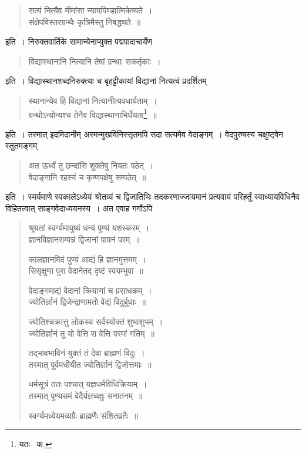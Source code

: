 \documentclass[11pt, openany]{book}
\begin{document}
\begin{quote}
 
{\qt सत्यं नित्यैव मीमांसा न्यायपिण्डात्मिकेष्यते~।\\
संक्षेपविस्तरग्रन्थैः कृत्रिमैस्तु निबद्ध्यते~॥}
\end{quote}

\noindent इति~। निरुक्तवार्तिके सामान्येनाप्युक्त पद्मपादाचार्येण\textendash 

\begin{quote} 
{\qt विद्यास्थानानि नित्यानि तेषां ग्रन्थाः सकर्तृकाः~।}
\end{quote}

\newpage

\noindent इति~। विद्यास्थानशब्दनिरुक्त्या च बृहट्टीकायां विद्यानां नित्यत्वं प्रदर्शितम्\textendash 

\begin{quote}
{\qt स्थानान्येव हि विद्यानां नित्यानीत्यवधार्यताम्~।\\
  ग्रन्थोऽन्योन्यश्च तेनैव विद्यास्थानाभिर्धेयता\renewcommand{\thefootnote}{१}\footnote{यतः \textendash\ क.}~॥}
\end{quote}

\noindent इति~। तस्मात् इदमिदानीम् अस्मन्मुखविनिस्सृतमपि सदा सत्यमेव वेदाङ्गम्~। वेदपुरुषस्य चक्षुष्ट्वेन स्तुतमङ्गम्\textendash 

\begin{quote}
{\qt अत ऊर्ध्वं तु छन्दांसि शुक्लेषु नियतः पठेत्~।\\
वेदाङ्गानि रहस्यं च कृष्णपक्षेषु सम्पठेत्~॥}
\end{quote}

\noindent इति~। स्मर्यमाणे स्वकालेऽध्येयं श्रोतव्यं च द्विजातिभिः तदकरणाज्जायमानं प्रत्यवायं परिहर्तुं स्वाध्यायविधिनैव विहितत्वात् साङ्गवेदाध्ययनस्य~। अत एवाह गर्गोऽपि\textendash 

\begin{quote}
{\qt श्रूयतां स्वर्ग्यमायुष्यं धन्यं पुण्यं यशस्करम्~।\\
ज्ञानविज्ञानसम्पन्नं द्विजानां पावनं परम्~॥
	
कालज्ञानमिदं पुण्यं आद्यं हि ज्ञानमुत्तमम्~।\\
सिसृक्षुणा पुरा वेदानेतद् दृष्टं स्वयम्भुवा~॥

वेदाङ्गमाद्यं वेदानां क्रियाणां च प्रसाधकम्~।\\
ज्योतिर्ज्ञानं द्विजेन्द्राणामतो वेद्यं विदुर्बुधाः~॥
	
ज्योतिश्चक्रात्तु लोकस्य सर्वस्योक्तं शुभाशुभम्~।\\
ज्योतिर्ज्ञानं तु यो वेत्ति स वेत्ति परमां गतिम्~॥
	
तद्भावभाविनं युक्तं तं देवा ब्राह्मणं विदुः~।\\
तस्मात् पूर्वमधीयीत ज्योतिर्ज्ञानं द्विजोत्तमाः~॥
	
धर्मसूत्रं ततः पश्चात् यज्ञधर्मविधिक्रियाम्~।\\
तस्मात् पुण्यसमं वेदैर्यज्ञचक्षुः सनातनम्~॥
	
स्वर्ग्यमध्येयमव्यग्रैः ब्राह्मणैः संशितव्रतैः~॥}
\end{quote}
\end{document}

